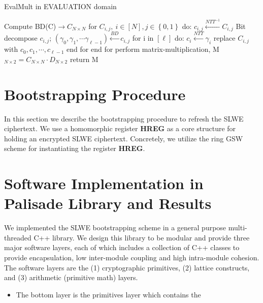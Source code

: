 \documentclass[10pt,journal,compsoc]{IEEEtran}
\theoremstyle{definition}
\begin{document}
\begin{algorithm}
\caption{EvalMult in EVALUATION domain}
\begin{algorithmic}[1]
\State Compute BD(C)$\rightarrow C_{N\times N}$
\State for $C_{i,j}, \ i \in [N], j \in \left\{0,1 \right\}$ do:
\State \quad $c_{i,j} \xleftarrow{NTT^{-1}} C_{i,j}$
\State \quad Bit decompose $c_{i,j}$; $\left(\gamma_0,\gamma_1,\cdots \gamma_{\ell-1}\right)\xleftarrow{BD} c_{i,j}$ 
\State \quad for i in $\left[\ell \right]$ do:
\State \quad \quad $c_i \xleftarrow{NTT} \gamma_i$
\State \quad replace $C_{i,j}$ with $c_{0},c_{1},\cdots,c_{\ell-1}$
\State \quad end for
\State end for
\State perform matrix-multiplication, M$_{N\times 2} = C_{N \times N}\cdot D_{N \times 2}$ 
\State return M

\EndProcedure
\end{algorithmic}
\end{algorithm}
\section{Bootstrapping Procedure}

In this section we describe the bootstrapping procedure to refresh the SLWE ciphertext. We use a homomorphic register \textbf{HREG} as a core structure for holding an encrypted SLWE ciphertext. Concretely, we utilize the ring GSW scheme for instantiating the register \textbf{HREG}.

\section{Software Implementation in Palisade Library and Results}
We implemented the SLWE bootstrapping scheme in a general purpose multi-threaded C++ library. We design this library to be modular and provide three major software layers, each of which includes a collection of C++ classes to provide encapsulation, low inter-module coupling and high intra-module cohesion. The software layers are the (1) cryptographic primitives, (2) lattice constructs, and (3) arithmetic (primitive math) layers.

\begin{itemize}
\item The bottom layer is the primitives layer which contains the 
\end{itemize}
\appendices


\ifCLASSOPTIONcompsoc
\end{document}
